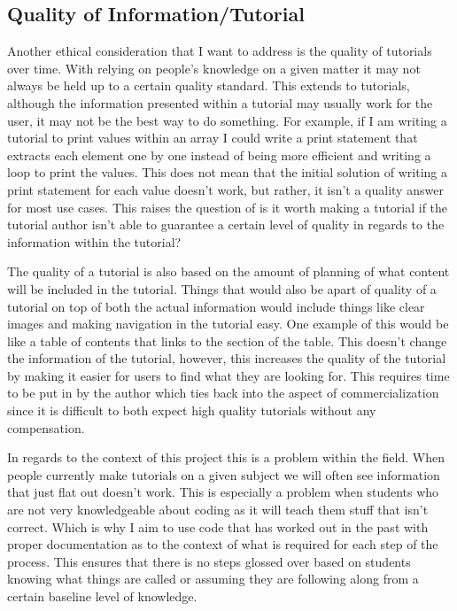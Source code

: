 \documentclass[10pt,twocolumn]{article}
\begin{document}
\subsection{Quality of Information/Tutorial}
Another ethical consideration that I want to address is the quality of tutorials over time. With relying on people's knowledge on a given matter it may not always be held up to a certain quality standard. This extends to tutorials, although the information presented within a tutorial may usually work for the user, it may not be the best way to do something. For example, if I am writing a tutorial to print values within an array I could write a print statement that extracts each element one by one instead of being more efficient and writing a loop to print the values. This does not mean that the initial solution of writing a print statement for each value doesn't work, but rather, it isn't a quality answer for most use cases. This raises the question of is it worth making a tutorial if the tutorial author isn't able to guarantee a certain level of quality in regards to the information within the tutorial?

The quality of a tutorial is also based on the amount of planning of what content will be included in the tutorial\cite{mclean_recommendations_2022}. Things that would also be apart of quality of a tutorial on top of both the actual information would include things like clear images and making navigation in the tutorial easy. One example of this would be like a table of contents that links to the section of the table. This doesn't change the information of the tutorial, however, this increases the quality of the tutorial by making it easier for users to find what they are looking for. This requires time to be put in by the author which ties back into the aspect of commercialization since it is difficult to both expect high quality tutorials without any compensation. 



In regards to the context of this project this is a problem within the field. When people currently make tutorials on a given subject we will often see information that just flat out doesn't work. This is especially a problem when students who are not very knowledgeable about coding as it will teach them stuff that isn't correct. Which is why I aim to use code that has worked out in the past with proper documentation as to the context of what is required for each step of the process. This ensures that there is no steps glossed over based on students knowing what things are called or assuming they are following along from a certain baseline level of knowledge. 
\end{document}
